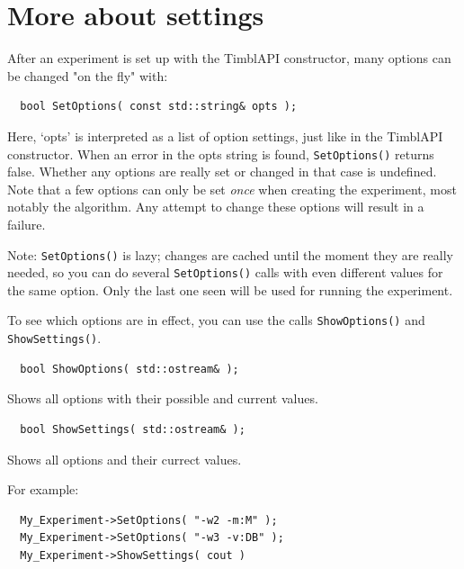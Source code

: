 \documentclass{report}
\begin{document}
\section{More about settings}

After an experiment is set up with the TimblAPI constructor, many
options can be changed "on the fly" with:

\begin{footnotesize}
\begin{verbatim}
  bool SetOptions( const std::string& opts );
\end{verbatim}
\end{footnotesize}

Here, `opts' is interpreted as a list of option settings, just like in
the TimblAPI constructor. When an error in the opts string is found,
{\tt SetOptions()} returns false. Whether any options are really set
or changed in that case is undefined. Note that a few options can only
be set {\em once}\/ when creating the experiment, most notably the
algorithm. Any attempt to change these options will result in a
failure.

Note: {\tt SetOptions()} is lazy; changes are cached until the
moment they are really needed, so you can do several {\tt SetOptions()}
calls with even different values for the same option. Only the last
one seen will be used for running the experiment.

To see which options are in effect, you can use the calls {\tt ShowOptions()}
and {\tt ShowSettings()}.

\begin{footnotesize}
\begin{verbatim}
  bool ShowOptions( std::ostream& );
\end{verbatim}
\end{footnotesize}

Shows all options with their possible and current values.

\begin{footnotesize}
\begin{verbatim}
  bool ShowSettings( std::ostream& );
\end{verbatim}
\end{footnotesize}

Shows all options and their currect values.

For example:

\begin{footnotesize}
\begin{verbatim}
  My_Experiment->SetOptions( "-w2 -m:M" );
  My_Experiment->SetOptions( "-w3 -v:DB" );
  My_Experiment->ShowSettings( cout )
\end{verbatim}
\end{footnotesize}
\end{document}
